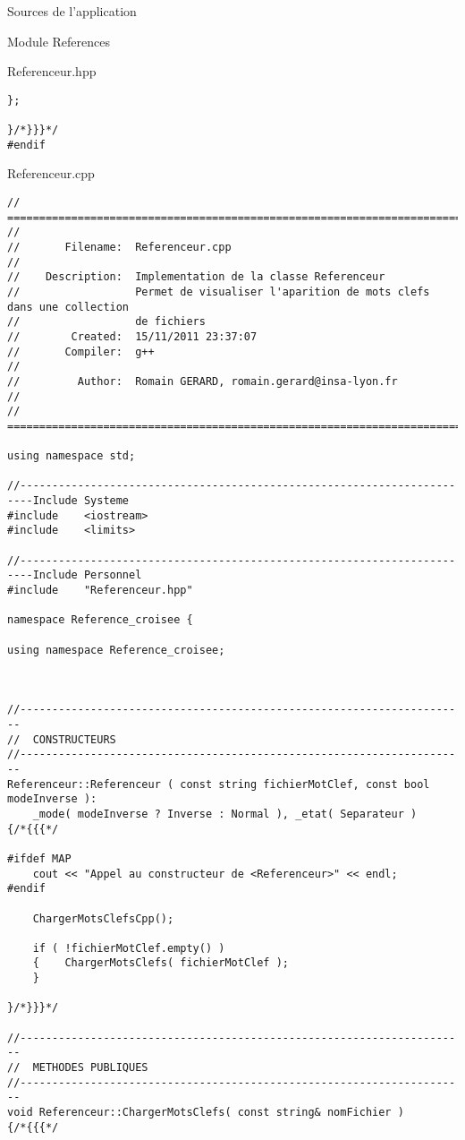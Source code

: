\documentclass{article}
\begin{document}
\begin{section}{Sources de l'application}
\begin{subsection}{Module References}
\begin{paragraph}{Referenceur.hpp}
\begin{verbatim}
};

}/*}}}*/
#endif

  \end{verbatim}
  \end{paragraph}



\newpage
  \begin{paragraph}{Referenceur.cpp}
   \begin{verbatim}
// =====================================================================================
//
//       Filename:  Referenceur.cpp
//
//    Description:  Implementation de la classe Referenceur
//                  Permet de visualiser l'aparition de mots clefs dans une collection
//                  de fichiers
//        Created:  15/11/2011 23:37:07
//       Compiler:  g++
//
//         Author:  Romain GERARD, romain.gerard@insa-lyon.fr
//
// =====================================================================================

using namespace std;

//------------------------------------------------------------------------Include Systeme
#include    <iostream>
#include    <limits>

//------------------------------------------------------------------------Include Personnel
#include    "Referenceur.hpp"

namespace Reference_croisee {

using namespace Reference_croisee;



//----------------------------------------------------------------------
//  CONSTRUCTEURS
//----------------------------------------------------------------------
Referenceur::Referenceur ( const string fichierMotClef, const bool modeInverse ):
    _mode( modeInverse ? Inverse : Normal ), _etat( Separateur )
{/*{{{*/

#ifdef MAP
    cout << "Appel au constructeur de <Referenceur>" << endl;
#endif

    ChargerMotsClefsCpp();

    if ( !fichierMotClef.empty() ) 
    {    ChargerMotsClefs( fichierMotClef );
    }

}/*}}}*/

//----------------------------------------------------------------------
//  METHODES PUBLIQUES
//----------------------------------------------------------------------
void Referenceur::ChargerMotsClefs( const string& nomFichier )
{/*{{{*/



\end{verbatim}
\end{paragraph}
\end{subsection}
\end{section}
\end{document}
